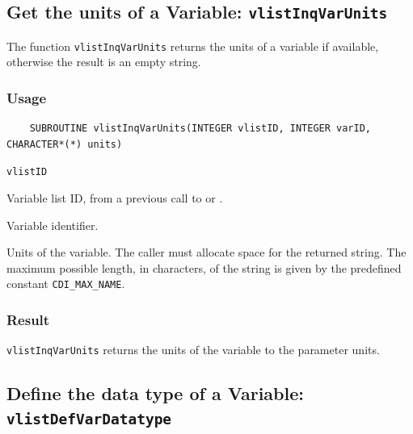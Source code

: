 \subsection{Get the units of a Variable: \texttt{vlistInqVarUnits}}
\label{vlistInqVarUnits}

The function {\texttt{vlistInqVarUnits}} returns the units of a variable if available,
otherwise the result is an empty string.

\subsubsection*{Usage}

\begin{verbatim}
    SUBROUTINE vlistInqVarUnits(INTEGER vlistID, INTEGER varID, CHARACTER*(*) units)
\end{verbatim}

\hspace*{4mm}\begin{minipage}[]{15cm}
\begin{deflist}{\texttt{vlistID}\ }
\item[\texttt{vlistID}]
Variable list ID, from a previous call to {} or {}.
\item[\texttt{varID}]
Variable identifier.
\item[\texttt{units}]
Units of the variable. The caller must allocate space for the
                    returned string. The maximum possible length, in characters, of
                    the string is given by the predefined constant {\texttt{CDI\_MAX\_NAME}}.

\end{deflist}
\end{minipage}

\subsubsection*{Result}

{\texttt{vlistInqVarUnits}} returns the units of the variable to the parameter units.



\subsection{Define the data type of a Variable: \texttt{vlistDefVarDatatype}}
\label{vlistDefVarDatatype}


